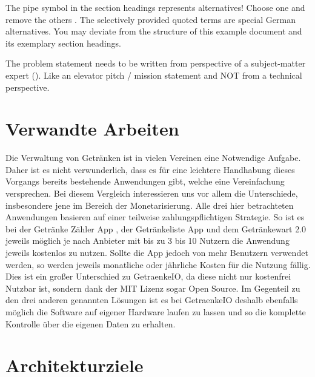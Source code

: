 \documentclass[conference,a4paper]{cs-techrep}
\begin{document}
The pipe symbol \textquote{\textbar{}} in the section headings represents alternatives! Choose one and remove the others \faWarning{}. The selectively provided quoted terms are special German alternatives. You may deviate from the structure of this example document and its exemplary section headings.

The problem statement needs to be written from perspective of a subject-matter expert (). Like an elevator pitch / mission statement \faWarning{} and NOT from a technical perspective.


\section{Verwandte Arbeiten}
Die Verwaltung von Getränken ist in vielen Vereinen eine Notwendige Aufgabe. Daher ist es nicht verwunderlich, dass es für eine leichtere Handhabung dieses Vorgangs bereits bestehende Anwendungen gibt, welche eine Vereinfachung versprechen. Bei diesem Vergleich interessieren uns vor allem die Unterschiede, insbesondere jene im Bereich der Monetarisierung.
Alle drei hier betrachteten Anwendungen basieren auf einer teilweise zahlungspflichtigen Strategie. So ist es bei der Getränke Zähler App \cite{drinkscounter}, der Getränkeliste App \cite{getraenkelisteapp} und dem Getränkewart 2.0 \cite{getraenkewart} jeweils möglich je nach Anbieter mit bis zu 3 bis 10 Nutzern die Anwendung jeweils kostenlos zu nutzen. Sollte die App jedoch von mehr Benutzern verwendet werden, so werden jeweils monatliche oder jährliche Kosten für die Nutzung fällig. Dies ist ein großer Unterschied zu GetraenkeIO, da diese nicht nur kostenfrei Nutzbar ist, sondern dank der MIT Lizenz sogar Open Source. Im Gegenteil zu den drei anderen genannten Lösungen ist es bei GetraenkeIO deshalb ebenfalls möglich die Software auf eigener Hardware laufen zu lassen und so die komplette Kontrolle über die eigenen Daten zu erhalten.

\section{Architekturziele} %
\end{document}
